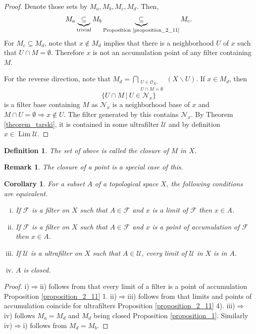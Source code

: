 \documentclass[8pt]{article}
\numberwithin{equation}{section}
\newtheorem{definition}{Definition}[subsection]
\newtheorem{remark}{Remark}[subsection]
\newtheorem{corollary}{Corollary} [subsection]
\DeclareMathOperator{\Lim}{Lim}
\newcommand{\Ouv}{\mathscr{O}}
\newcommand{\F}[0]{\mathcal{F}}
\newcommand{\U}[0]{\mathcal{U}}
\newcommand{\sep}[0]{\:|\:}
\begin{document}
\begin{proof}
    Denote those sets by $M_a,M_b,M_c,M_d$. Then,
    \begin{equation*}
        M_a\underbrace{\subseteq}_{\text{trivial}}M_b\underbrace{\subseteq}_{\text{Proposition \ref{proposition_2_11}}} M_c.
    \end{equation*}
    For $M_c\subseteq M_d$, note that $x\not\in M_d$ implies that there is a neighborhood $U$ of $x$ such that $U\cap M=\emptyset$. Therefore $x$ is not an accumulation point of any filter containing $M$.
    \par For the reverse direction, note that $M_d = \bigcap_{\substack{U\in\Ouv_X,\\U\cap M=\emptyset}}(X\backslash U)$. If $x\in M_d$, then 
    \begin{equation*}
        \{U\cap M\sep U\in\mathcal{N}_x\}
    \end{equation*}
    is a filter base containing $M$ as $\mathcal{N}_x$ is a neighborhood base of $x$ and $M\cap U=\emptyset\Rightarrow x\not\in U$. The filter generated by this contains $\mathcal{N}_x$. By Theorem \ref{theorem_tarski}, it is contained in some ultrafilter $\mathcal{U}$ and by definition $x\in\Lim\mathcal{U}$.
\end{proof}
\begin{definition}
    \label{definition_10}
    The set of above is called the closure of $M$ in $X$.
\end{definition}
\begin{remark}
    \label{remark_2}
    The closure of a point is a special case of this.
\end{remark}
\begin{corollary}
    \label{corollary_1}
    For a subset $A$ of a topological space $X$, the following conditions are equivalent.
    \begin{enumerate}[i.]
        \item If $\F$ is a filter on $X$ such that $A\in\F$ and $x$ is a limit of $\F$ then $x\in A$.
        \item If $\F$ is a filter on $X$ such that $A\in\F$ and $x$ is a point of accumulation of $\F$ then $x\in A$.
        \item If $\mathcal{U}$ is a ultrafilter on $X$ such that $A\in\mathcal{U}$, every limit of $\mathcal{U}$ in $X$ is in $A$.
        \item $A$ is closed.
    \end{enumerate}
\end{corollary}
\begin{proof}
    i)$\Rightarrow$ii) follows from that every limit of a filter is a point of accumulation Proposition \ref{proposition_2_11} 1. ii)$\Rightarrow$iii) follows from that limits and points of accumulation coincide for ultrafilters Proposition \ref{proposition_2_11} 4). iii)$\Rightarrow$iv) follows $M_a=M_d$ and $M_d$ being closed Proposition \ref{proposition_1}. Similarly iv)$\Rightarrow$i) follows from $M_d = M_b$.
\end{proof}
\end{document}
